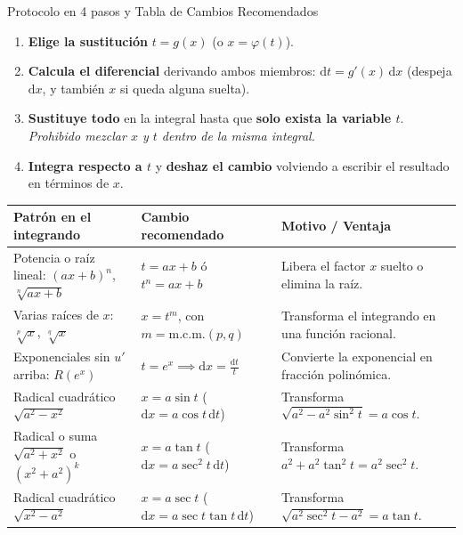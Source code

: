 \documentclass[10pt,a4paper]{article}
\begin{document}
\begin{formulabox}{Protocolo en 4 pasos y Tabla de Cambios Recomendados}
\begin{enumerate}\itemsep 1.5pt
  \item \textbf{Elige la sustitución} $t = g(x)$ (o $x = \varphi(t)$).
  \item \textbf{Calcula el diferencial} derivando ambos miembros: $\mathrm{d}t = g'(x)\,\mathrm{d}x$ (despeja $\mathrm{d}x$, y también $x$ si queda alguna suelta).
  \item \textbf{Sustituye todo} en la integral hasta que \textbf{solo exista la variable $t$}. \textit{Prohibido mezclar $x$ y $t$ dentro de la misma integral.}
  \item \textbf{Integra respecto a $t$} y \textbf{deshaz el cambio} volviendo a escribir el resultado en términos de $x$.
\end{enumerate}

\vspace{2mm}
\centering
\renewcommand{\arraystretch}{1.3}
\small
\begin{tabularx}{\linewidth}{@{}l l X@{}}
\toprule
\textbf{Patrón en el integrando} & \textbf{Cambio recomendado} & \textbf{Motivo / Ventaja} \\
\midrule
Potencia o raíz lineal: $(ax+b)^n$, $\sqrt[n]{ax+b}$ & $t = ax+b$ \;ó\; $t^n = ax+b$ & Libera el factor $x$ suelto o elimina la raíz. \\
Varias raíces de $x$: $\sqrt[p]{x}$, $\sqrt[q]{x}$ & $x = t^m$, con $m = \mathrm{m.c.m.}(p, q)$ & Transforma el integrando en una función racional. \\
Exponenciales sin $u'$ arriba: $R(e^x)$ & $t = e^x \implies \mathrm{d}x = \frac{\mathrm{d}t}{t}$ & Convierte la exponencial en fracción polinómica. \\
Radical cuadrático $\sqrt{a^2 - x^2}$ & $x = a\sin t$ \quad ($\mathrm{d}x = a\cos t\,\mathrm{d}t$) & Transforma $\sqrt{a^2 - a^2\sin^2 t} = a\cos t$. \\
Radical o suma $\sqrt{a^2 + x^2}$ o $(x^2+a^2)^k$ & $x = a\tan t$ \quad ($\mathrm{d}x = a\sec^2 t\,\mathrm{d}t$) & Transforma $a^2 + a^2\tan^2 t = a^2\sec^2 t$. \\
Radical cuadrático $\sqrt{x^2 - a^2}$ & $x = a\sec t$ \quad ($\mathrm{d}x = a\sec t\tan t\,\mathrm{d}t$) & Transforma $\sqrt{a^2\sec^2 t - a^2} = a\tan t$. \\
\bottomrule
\end{tabularx}
\end{formulabox}
\end{document}
